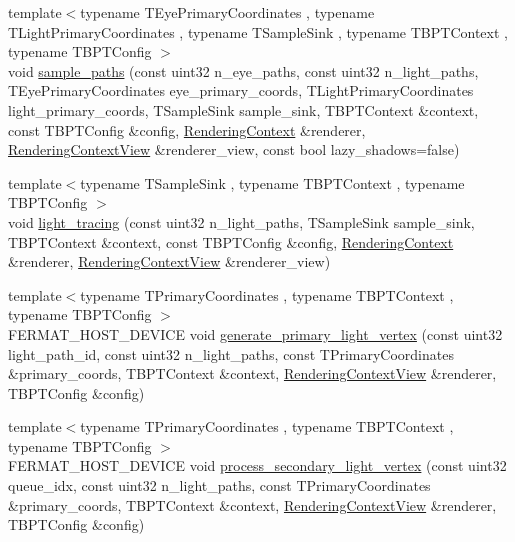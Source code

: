 \begin{DoxyCompactItemize}
{\footnotesize template$<$typename T\+Eye\+Primary\+Coordinates , typename T\+Light\+Primary\+Coordinates , typename T\+Sample\+Sink , typename T\+B\+P\+T\+Context , typename T\+B\+P\+T\+Config $>$ }\\void \hyperlink{group___b_p_t_lib_ga4c1164d859ed146eb306e8b7b178c7e7}{sample\+\_\+paths} (const uint32 n\+\_\+eye\+\_\+paths, const uint32 n\+\_\+light\+\_\+paths, T\+Eye\+Primary\+Coordinates eye\+\_\+primary\+\_\+coords, T\+Light\+Primary\+Coordinates light\+\_\+primary\+\_\+coords, T\+Sample\+Sink sample\+\_\+sink, T\+B\+P\+T\+Context \&context, const T\+B\+P\+T\+Config \&config, \hyperlink{struct_rendering_context}{Rendering\+Context} \&renderer, \hyperlink{struct_rendering_context_view}{Rendering\+Context\+View} \&renderer\+\_\+view, const bool lazy\+\_\+shadows=false)
\item 
{\footnotesize template$<$typename T\+Sample\+Sink , typename T\+B\+P\+T\+Context , typename T\+B\+P\+T\+Config $>$ }\\void \hyperlink{group___b_p_t_lib_ga497e0940986e5f948a9dcf42242d39c7}{light\+\_\+tracing} (const uint32 n\+\_\+light\+\_\+paths, T\+Sample\+Sink sample\+\_\+sink, T\+B\+P\+T\+Context \&context, const T\+B\+P\+T\+Config \&config, \hyperlink{struct_rendering_context}{Rendering\+Context} \&renderer, \hyperlink{struct_rendering_context_view}{Rendering\+Context\+View} \&renderer\+\_\+view)
\item 
{\footnotesize template$<$typename T\+Primary\+Coordinates , typename T\+B\+P\+T\+Context , typename T\+B\+P\+T\+Config $>$ }\\F\+E\+R\+M\+A\+T\+\_\+\+H\+O\+S\+T\+\_\+\+D\+E\+V\+I\+CE void \hyperlink{group___b_p_t_lib_core_gaa688dca0d66d8dfeffc8d2eedfb02246}{generate\+\_\+primary\+\_\+light\+\_\+vertex} (const uint32 light\+\_\+path\+\_\+id, const uint32 n\+\_\+light\+\_\+paths, const T\+Primary\+Coordinates \&primary\+\_\+coords, T\+B\+P\+T\+Context \&context, \hyperlink{struct_rendering_context_view}{Rendering\+Context\+View} \&renderer, T\+B\+P\+T\+Config \&config)
\item 
{\footnotesize template$<$typename T\+Primary\+Coordinates , typename T\+B\+P\+T\+Context , typename T\+B\+P\+T\+Config $>$ }\\F\+E\+R\+M\+A\+T\+\_\+\+H\+O\+S\+T\+\_\+\+D\+E\+V\+I\+CE void \hyperlink{group___b_p_t_lib_core_ga124952cd2917df181f6aa6f39cdeda1b}{process\+\_\+secondary\+\_\+light\+\_\+vertex} (const uint32 queue\+\_\+idx, const uint32 n\+\_\+light\+\_\+paths, const T\+Primary\+Coordinates \&primary\+\_\+coords, T\+B\+P\+T\+Context \&context, \hyperlink{struct_rendering_context_view}{Rendering\+Context\+View} \&renderer, T\+B\+P\+T\+Config \&config)

\end{DoxyCompactItemize}
